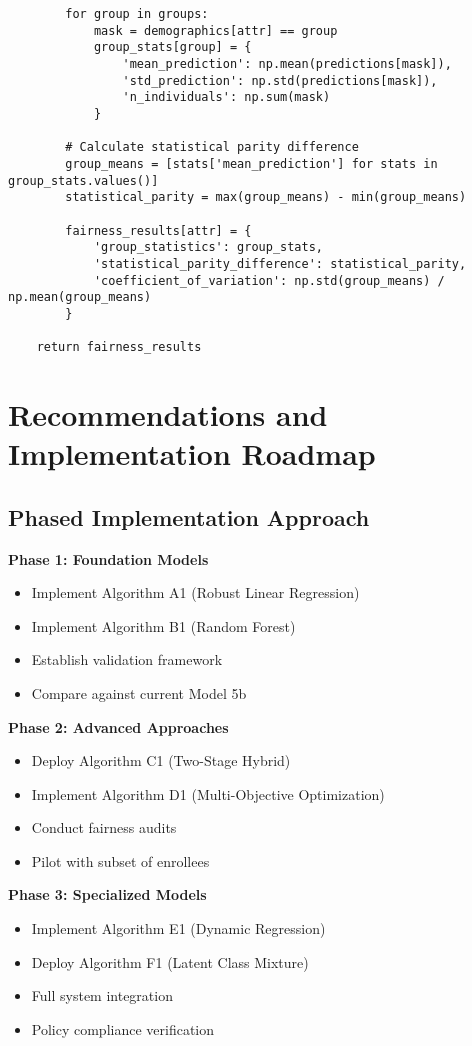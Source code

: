 \begin{lstlisting}
        for group in groups:
            mask = demographics[attr] == group
            group_stats[group] = {
                'mean_prediction': np.mean(predictions[mask]),
                'std_prediction': np.std(predictions[mask]),
                'n_individuals': np.sum(mask)
            }
        
        # Calculate statistical parity difference
        group_means = [stats['mean_prediction'] for stats in group_stats.values()]
        statistical_parity = max(group_means) - min(group_means)
        
        fairness_results[attr] = {
            'group_statistics': group_stats,
            'statistical_parity_difference': statistical_parity,
            'coefficient_of_variation': np.std(group_means) / np.mean(group_means)
        }
    
    return fairness_results
\end{lstlisting}

\section{Recommendations and Implementation Roadmap}

\subsection{Phased Implementation Approach}

\textbf{Phase 1: Foundation Models}
\begin{itemize}
    \item Implement Algorithm A1 (Robust Linear Regression)
    \item Implement Algorithm B1 (Random Forest)
    \item Establish validation framework
    \item Compare against current Model 5b
\end{itemize}

\textbf{Phase 2: Advanced Approaches}
\begin{itemize}
    \item Deploy Algorithm C1 (Two-Stage Hybrid)
    \item Implement Algorithm D1 (Multi-Objective Optimization)
    \item Conduct fairness audits
    \item Pilot with subset of enrollees
\end{itemize}

\textbf{Phase 3: Specialized Models}
\begin{itemize}
    \item Implement Algorithm E1 (Dynamic Regression)
    \item Deploy Algorithm F1 (Latent Class Mixture)
    \item Full system integration
    \item Policy compliance verification
\end{itemize}

